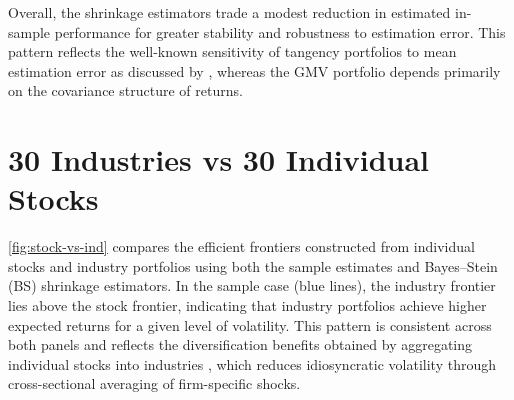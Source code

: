 \documentclass[11pt]{exam}
\begin{document}
\noindent Overall, the shrinkage estimators trade a modest reduction in estimated in-sample performance for greater stability and robustness to estimation error. This pattern reflects the well-known sensitivity of tangency portfolios to mean estimation error as discussed by \parencite{Merton1980}, whereas the GMV portfolio depends primarily on the covariance structure of returns.

\newpage 

\section{30 Industries vs 30 Individual Stocks}


\autoref{fig:stock-vs-ind} compares the efficient frontiers constructed from individual stocks and industry portfolios using both the sample estimates and Bayes–Stein (BS) shrinkage estimators. In the sample case (blue lines), the industry frontier lies above the stock frontier, indicating that industry portfolios achieve higher expected returns for a given level of volatility. This pattern is consistent across both panels and reflects the diversification benefits obtained by aggregating individual stocks into industries \parencite{Markowitz1952}, which reduces idiosyncratic volatility through cross-sectional averaging of firm-specific shocks.
\end{document}
